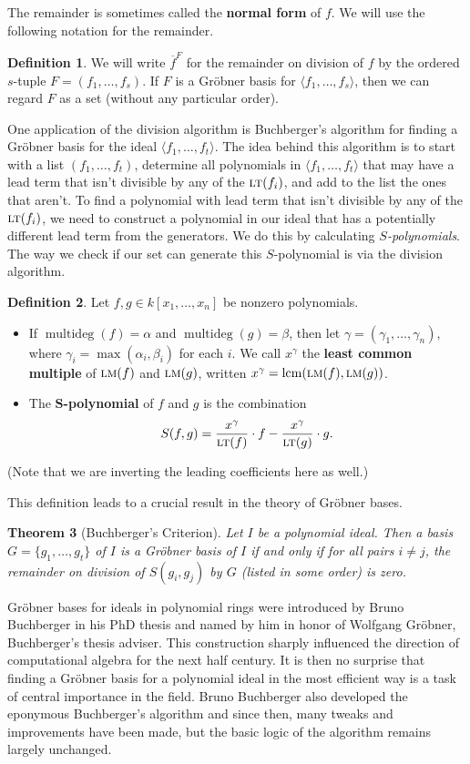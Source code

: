 \documentclass[MS, xcolor=dvipsnames]{wfuthesis}
\DeclareMathOperator{\lcm}{lcm}
\newcommand{\LT}{\ensuremath{\text{\sc lt}}}
\newcommand{\LM}{\ensuremath{\text{\sc lm}}}
\DeclareMathOperator{\multideg}{multideg}
\newtheorem{theorem}{Theorem}
\theoremstyle{definition}
\newtheorem{definition}[theorem]{Definition}
\begin{document}
The remainder is sometimes called the \textbf{normal form} of $f$. We will use the following notation for the remainder.
\begin{definition}
  We will write $\overline f^{F}$ for the remainder on division of $f$ by the ordered $s$-tuple $F = (f_1,\dots,f_s)$. If $F$ is a Gr\"obner basis for $\langle f_1,\dots,f_s \rangle$, then we can regard $F$ as a set  (without any particular order). 
\end{definition}
One application of the division algorithm is Buchberger's algorithm for finding a Gr\"obner basis for the ideal $\langle f_1,\dots,f_t \rangle$. The idea behind this algorithm is to start with a list $(f_1,\dots,f_t)$, determine all polynomials in $\langle f_1,\dots,f_t \rangle$ that may have a lead term that isn't divisible by any of the $\LT(f_i)$, and add to the list the ones that aren't. To find a polynomial with lead term that isn't divisible by any of the $\LT(f_i)$, we need to construct a polynomial in our ideal that has a potentially different lead term from the generators. We do this by calculating \emph{$S$-polynomials}. The way we check if our set can generate this $S$-polynomial is via the division algorithm. 
\begin{definition}
  Let $f,g \in k[x_1,\dots,x_n]$ be nonzero polynomials. 
  \begin{itemize}
    \item If $\multideg(f) = \alpha$ and $\multideg(g) = \beta$, then let $\gamma  =(\gamma_1,\dots,\gamma_n)$, where $\gamma_i = \max(\alpha_i,\beta_i)$ for each $i$. We call $x^\gamma$ the \textbf{least common multiple} of $\LM(f)$ and $\LM(g)$, written $x^\gamma = \lcm(\LM(f),\LM(g))$. 
    \item The \textbf{$\mathbf S$-polynomial} of $f$ and $g$ is the combination 
    \[ S(f,g) = \frac{x^\gamma}{\LT(f)} \cdot f - \frac{x^\gamma}{\LT(g)} \cdot g. \]
  \end{itemize}
  (Note that we are inverting the leading coefficients here as well.)
\end{definition}
This definition leads to a crucial result in the theory of Gr\"obner bases.
\begin{theorem}[Buchberger's Criterion]
  Let $I$ be a polynomial ideal. Then a basis $G = \{g_1,\dots,g_t\}$ of $I$ is a Gr\"obner basis of $I$ if and only if for all pairs $i \ne j$, the remainder on division of $S(g_i,g_j)$ by $G$ (listed in some order) is zero.
\end{theorem}
Gr\"obner bases for ideals in polynomial rings were introduced by Bruno Buchberger in his PhD thesis \cite{Buchberger1965} and named by him in honor of Wolfgang Gr\"obner, Buchberger's thesis adviser. This construction sharply influenced the direction of computational algebra for the next half century. It is then no surprise that finding a Gr\"obner basis for a polynomial ideal in the most efficient way is a task of central importance in the field. Bruno Buchberger also developed the eponymous Buchberger's algorithm and since then, many tweaks and improvements have been made, but the basic logic of the algorithm remains largely unchanged. 
\end{document}
